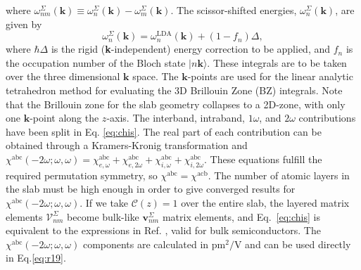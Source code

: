 \documentclass[prb,superscriptaddress,showpacs,twocolumn,letterpaper]{revtex4}
\begin{document}
where $\omega^\Sigma_{nm}(\mathbf{k})\equiv\omega^\Sigma_n(\mathbf{k})-\omega^
\Sigma_m(\mathbf{k})$. The scissor-shifted energies,
$\omega_{n}^\Sigma(\mathbf{k})$, are given by
\begin{equation*}
\omega_{n}^\Sigma(\mathbf{k})=
\omega^\mathrm{LDA}_{n}(\mathbf{k})+(1-f_{n})\Delta,
\end{equation*}
where $\hbar\Delta$ is the rigid (\textbf{k}-independent) energy correction to
be applied, and $f_n$ is the occupation number of the Bloch state
$|n\mathbf{k}\rangle$. These integrals are to be taken over the three
dimensional $\mathbf{k}$ space. The $\mathbf{k}$-points are used for the linear
analytic tetrahedron method for evaluating the 3D Brillouin Zone (BZ)
integrals.\cite{nastosPRB05} Note that the Brillouin zone for the slab geometry
collapses to a 2D-zone, with only one $\mathbf{k}$-point along the $z$-axis. The
interband, intraband, $1\omega$, and $2\omega$ contributions have been split in
Eq. \eqref{eq:chis}. The real part of each contribution can be obtained through
a Kramers-Kronig transformation\cite{nicolasPRB14} and
$\chi^{\text{a}\text{b}\text{c}}(-2\omega;\omega,\omega)=
\chi^{\text{a}\text{b}\text{c}}_{e,\omega}
+\chi^{\text{a}\text{b}\text{c}}_{e,2\omega}
+\chi^{\text{a}\text{b}\text{c}}_{i,\omega}
+\chi^{\text{a}\text{b}\text{c}}_{i,2\omega}$. These equations fulfill the
required permutation symmetry, so
$\chi^{\text{a}\text{b}\text{c}}=\chi^{\text{a}\text{c}\text{b}}$. The number of
atomic layers in the slab must be high enough in order to give converged results
for $\chi^{\mathrm{abc}}(-2\omega;\omega,\omega)$. If we take $\mathcal{C}(z)=1$
over the entire slab, the layered matrix elements
$\boldsymbol{\mathcal{V}}^{\Sigma}_{nm}$ become bulk-like
$\mathbf{v}^{\Sigma}_{nm}$ matrix elements, and Eq.~\eqref{eq:chis} is
equivalent to the expressions in Ref. , valid for bulk
semiconductors. The $\chi^{\mathrm{abc}}(-2\omega;\omega,\omega)$ components are
calculated in $\text{pm}^{2}/\text{V}$ and can be used directly in
Eq.\eqref{eq:r19}.
\end{document}
